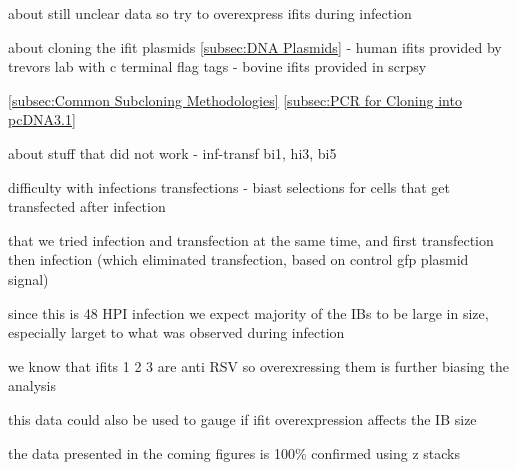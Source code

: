 about still unclear data so try to overexpress ifits during infection

about cloning the ifit plasmids \ref{subsec:DNA Plasmids}
- human ifits provided by trevors lab with c terminal flag tags
- bovine ifits provided in scrpsy 

\ref{subsec:Common Subcloning Methodologies}
\ref{subsec:PCR for Cloning into pcDNA3.1}


about stuff that did not work
- inf-transf bi1, hi3, bi5

difficulty with infections transfections - biast selections for cells that get transfected after infection

that we tried infection and transfection at the same time, and first transfection then infection (which eliminated transfection, based on control gfp plasmid signal)

since this is 48 HPI infection we expect majority of the IBs to be large in size, especially larget to what was observed during infection

we know that ifits 1 2 3 are anti RSV so overexressing them is further biasing the analysis

this data could also be used to gauge if ifit overexpression affects the IB size

the data presented in the coming figures is 100\% confirmed using z stacks

